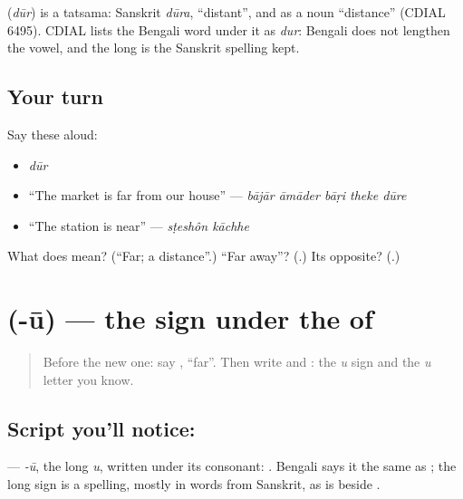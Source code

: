 \begin{cousinweb}
\textbf{} (\emph{dūr}) is a tatsama: Sanskrit \emph{dūra}, \textquotedblleft{}distant\textquotedblright{}, and as a noun \textquotedblleft{}distance\textquotedblright{} (CDIAL 6495). CDIAL lists the Bengali word under it as \emph{dur}: Bengali does not lengthen the vowel, and the long \textbf{} is the Sanskrit spelling kept.
\end{cousinweb}

\subsection*{Your turn}
Say these aloud:

\begin{itemize}
\raggedright
  \item \emph{dūr}
  \item \textquotedblleft{}The market is far from our house\textquotedblright{} — \emph{bājār āmāder bāṛi theke dūre}
  \item \textquotedblleft{}The station is near\textquotedblright{} — \emph{sṭeshôn kāchhe}
\end{itemize}

\begin{tcolorbox}[breakable,colback=teal!4,colframe=teal!35!black,title={Before you move on}]
What does \textbf{} mean? (\textquotedblleft{}Far; a distance\textquotedblright{}.) \textquotedblleft{}Far away\textquotedblright{}? (\textbf{}.) Its opposite? (\textbf{}.)
\end{tcolorbox}
\section[\texorpdfstring{\bn{ূ} (-ū)}{ূ (-ū)}]{ (-ū) — the sign under the  of }

\label{lesson:BN-W270-letter-uu-kar}



\begin{quote}
Before the new one: say \textbf{}, \textquotedblleft{}far\textquotedblright{}. Then write \textbf{} and \textbf{}: the \emph{u} sign and the \emph{u} letter you know.
\end{quote}

\subsection*{Script you'll notice: }
\textbf{} — \emph{-ū}, the long \emph{u}, written under its consonant: \textbf{}. Bengali says it the same as \textbf{}; the long sign is a spelling, mostly in words from Sanskrit, as \textbf{} is beside \textbf{}.

